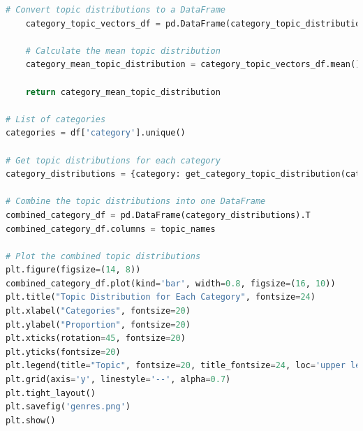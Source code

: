 \documentclass{article}
\begin{document}
\begin{lstlisting}[language=Python]
    # Convert topic distributions to a DataFrame
    category_topic_vectors_df = pd.DataFrame(category_topic_distributions, columns=[f"Topic {i}" for i in range(num_topics)])
    
    # Calculate the mean topic distribution
    category_mean_topic_distribution = category_topic_vectors_df.mean()
    
    return category_mean_topic_distribution

# List of categories
categories = df['category'].unique()

# Get topic distributions for each category
category_distributions = {category: get_category_topic_distribution(category) for category in categories}

# Combine the topic distributions into one DataFrame
combined_category_df = pd.DataFrame(category_distributions).T
combined_category_df.columns = topic_names

# Plot the combined topic distributions
plt.figure(figsize=(14, 8))
combined_category_df.plot(kind='bar', width=0.8, figsize=(16, 10))
plt.title("Topic Distribution for Each Category", fontsize=24)
plt.xlabel("Categories", fontsize=20)
plt.ylabel("Proportion", fontsize=20)
plt.xticks(rotation=45, fontsize=20)
plt.yticks(fontsize=20)
plt.legend(title="Topic", fontsize=20, title_fontsize=24, loc='upper left', bbox_to_anchor=(1, 1))
plt.grid(axis='y', linestyle='--', alpha=0.7)
plt.tight_layout()
plt.savefig('genres.png')
plt.show()

\end{lstlisting}
\end{document}
